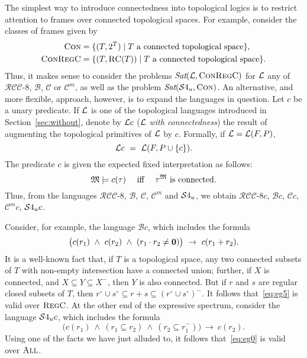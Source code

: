 \documentclass{LMCS}
\theoremstyle{plain}
\newcommand{\cB}{\ensuremath{\mathcal{B}}}\newcommand{\cBc}{\ensuremath{\mathcal{B}c}}\newcommand{\cBcc}{\ensuremath{\mathcal{B}cc}}
\newcommand{\cBC}{\ensuremath{\mathcal{C}}}
\newcommand{\cBCc}{\ensuremath{\cBC{}c}} \newcommand{\cBCcc}{\ensuremath{\cBC{}cc}}
\newcommand{\RCCE}{\ensuremath{\mathcal{RCC}\text{-}8}}\newcommand{\RCCEcc}{\ensuremath{\RCCE{}cc}}\newcommand{\RCCEc}{\ensuremath{\RCCE{}c}}
\newcommand{\ti}[2][]{#2^{\circ_{#1}}}
\newcommand{\tc}[2][]{#2^{-_{#1}}}
\newcommand{\Sat}{\textit{Sat}}
\newcommand{\All}{\textsc{All}}
\newcommand{\Regc}{\textsc{RegC}}
\newcommand{\ConR}{\textsc{ConRegC}}
\begin{document}
The simplest way to introduce connectedness into topological logics
is to restrict attention to frames over connected topological
spaces.  For example, consider the classes of frames given by
\begin{align*}
\Con  &=  \{(T, 2^T) \mid \mbox{$T$ a connected topological space} \}, \\
\ConR  &=  \{(T, \RegC(T)) \mid \mbox{$T$ a connected topological space} \}.
\end{align*}
Thus, it makes sense to consider the problems $\Sat(\cL,\ConR)$ for
$\mathcal{L}$ any of $\RCCE$, $\cB$, $\cBC$ or $\cBC^m$, as well as the problem
$\Sat(\SFU,\Con)$.  An alternative, and more flexible, approach,
however, is to expand the languages in question. Let $c$ be a unary
predicate.  If $\mathcal{L}$ is one of the topological languages introduced in
Section~\ref{sec:without}, denote by $\mathcal{L}c$ ($\mathcal{L}$ {\em with
connectedness}) the result of augmenting the topological primitives of
$\mathcal{L}$ by $c$.  Formally, if $\mathcal{L} = \mathcal{L}(F,P)$,
\begin{equation*}
\mathcal{L}c ~=~ \mathcal{L}(F, P \cup \{c\}).
\end{equation*}
The predicate $c$ is given the expected fixed interpretation as follows:
\begin{equation*}
\mathfrak{M} \models c(\tau) \quad \mbox{ iff } \quad \tau^{\mathfrak{M}} \mbox{ is connected}.
\end{equation*}
Thus, from the languages $\RCCE$, $\cB$, $\cBC$,  $\cBC^m$ and $\mathcal{S}4_u$, we obtain
$\RCCEc$, $\cBc$, $\cBCc$,  $\cBC^m\!c$, $\mathcal{S}4_u{}c$.

Consider, for example, the language $\cBc$, which includes the formula
\begin{equation}\label{eq:eg5}
\big ( c(r_1) \ \wedge \ c(r_2) \ \wedge \ (r_1 \cdot r_2 \ne \mathbf{0}) \big ) \ \rightarrow \ c(r_1+r_2).
\end{equation}
It is a well-known fact that, if $T$ is a topological space, any
two
connected subsets of $T$ with non-empty intersection have a connected
union; further, if $X$ is connected, and $X \subseteq Y \subseteq
\tc{X}$, then $Y$ is also connected. But if $r$ and $s$ are regular closed
subsets of $T$, then $\ti{r} \cup \ti{s} \subseteq r+s
\subseteq \tc{(\ti{r} \cup \ti{s})}$.  It follows that~\eqref{eq:eg5}
is valid over $\Regc$.  At the other end of the expressive spectrum,
consider the language $\mathcal{S}4_u{}c$, which includes the formula
\begin{equation}\label{eq:eg0}
\big ( c(r_1) \ \wedge \ ( r_1 \subseteq r_2 ) \ \wedge \ ( r_2 \subseteq \tc{r_1} ) \big ) \ \rightarrow \ c(r_2).
\end{equation}
Using one of the facts we have just alluded to, it follows that~\eqref{eq:eg0} is
valid over $\All$.
\end{document}
